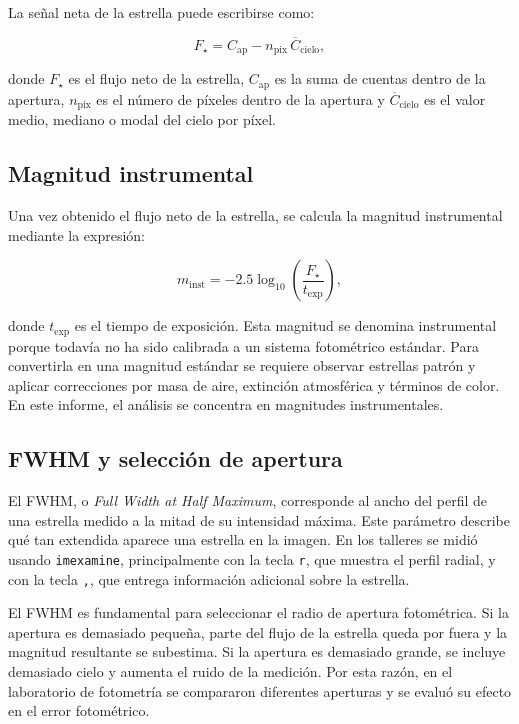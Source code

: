 \documentclass[12pt,letterpaper]{article}
\begin{document}
La señal neta de la estrella puede escribirse como:

\begin{equation}
    F_{\star} = C_{\text{ap}} - n_{\text{pix}} \, \overline{C}_{\text{cielo}},
\end{equation}

donde $F_{\star}$ es el flujo neto de la estrella, $C_{\text{ap}}$ es la suma de cuentas dentro de la apertura, $n_{\text{pix}}$ es el número de píxeles dentro de la apertura y $\overline{C}_{\text{cielo}}$ es el valor medio, mediano o modal del cielo por píxel.

\subsection{Magnitud instrumental}

Una vez obtenido el flujo neto de la estrella, se calcula la magnitud instrumental mediante la expresión:

\begin{equation}
    m_{\text{inst}} = -2.5 \log_{10}\left(\frac{F_{\star}}{t_{\text{exp}}}\right),
\end{equation}

donde $t_{\text{exp}}$ es el tiempo de exposición. Esta magnitud se denomina instrumental porque todavía no ha sido calibrada a un sistema fotométrico estándar. Para convertirla en una magnitud estándar se requiere observar estrellas patrón y aplicar correcciones por masa de aire, extinción atmosférica y términos de color. En este informe, el análisis se concentra en magnitudes instrumentales.

\subsection{FWHM y selección de apertura}

El FWHM, o \textit{Full Width at Half Maximum}, corresponde al ancho del perfil de una estrella medido a la mitad de su intensidad máxima. Este parámetro describe qué tan extendida aparece una estrella en la imagen. En los talleres se midió usando \texttt{imexamine}, principalmente con la tecla \texttt{r}, que muestra el perfil radial, y con la tecla \texttt{,}, que entrega información adicional sobre la estrella.

El FWHM es fundamental para seleccionar el radio de apertura fotométrica. Si la apertura es demasiado pequeña, parte del flujo de la estrella queda por fuera y la magnitud resultante se subestima. Si la apertura es demasiado grande, se incluye demasiado cielo y aumenta el ruido de la medición. Por esta razón, en el laboratorio de fotometría se compararon diferentes aperturas y se evaluó su efecto en el error fotométrico.
\end{document}
